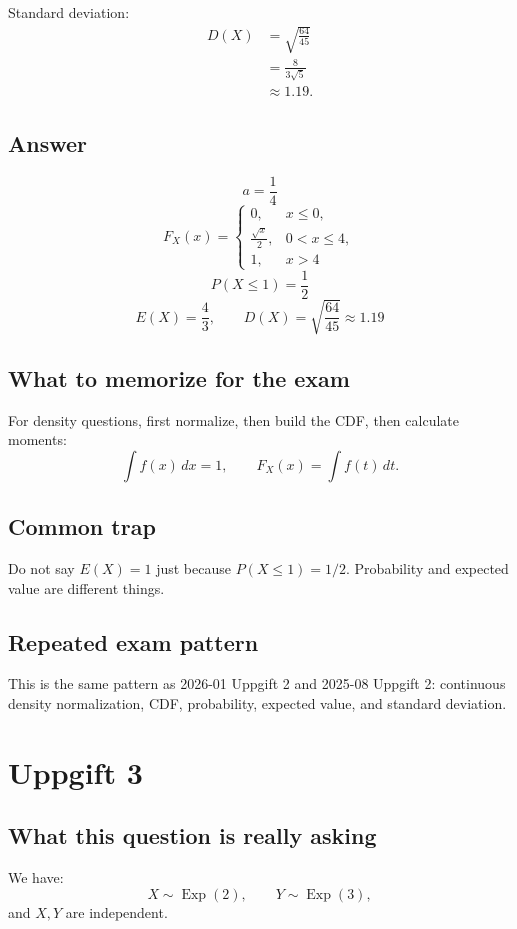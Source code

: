 \documentclass[11pt,a4paper]{article}
\begin{document}
Standard deviation:
\begin{align*}
D(X)
&=\sqrt{\frac{64}{45}}\\
&=\frac{8}{3\sqrt{5}}\\
&\approx 1.19.
\end{align*}

\subsection*{Answer}
\[
\boxed{a=\frac{1}{4}}
\]
\[
\boxed{
F_X(x)=
\begin{cases}
0, & x\le 0,\\
\frac{\sqrt{x}}{2}, & 0<x\le 4,\\
1, & x>4
\end{cases}}
\]
\[
\boxed{P(X\le 1)=\frac{1}{2}}
\]
\[
\boxed{E(X)=\frac{4}{3}},\qquad
\boxed{D(X)=\sqrt{\frac{64}{45}}\approx 1.19}
\]

\subsection*{What to memorize for the exam}
For density questions, first normalize, then build the CDF, then calculate moments:
\[
\int f(x)\,dx=1,\qquad F_X(x)=\int f(t)\,dt.
\]

\subsection*{Common trap}
Do not say \(E(X)=1\) just because \(P(X\le 1)=1/2\). Probability and expected value are different things.

\subsection*{Repeated exam pattern}
This is the same pattern as 2026-01 Uppgift 2 and 2025-08 Uppgift 2: continuous density normalization, CDF, probability, expected value, and standard deviation.

\section*{Uppgift 3}

\subsection*{What this question is really asking}
We have:
\[
X\sim \operatorname{Exp}(2),\qquad Y\sim \operatorname{Exp}(3),
\]
and \(X,Y\) are independent.
\end{document}
